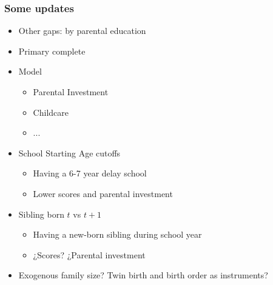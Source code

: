 \documentclass{beamer}
\begin{document}
\begin{frame}
    \label{update_scott}
    \frametitle{Some updates}
    \begin{itemize}
        \item Other gaps: by parental education
        \item Primary complete
        \item Model
            \begin{itemize}
            \item Parental Investment
            \item Childcare
            \item ...
            \end{itemize}
        \item School Starting Age cutoffs
            \begin{itemize}
                \item Having a 6-7 year delay school
                \item Lower scores and parental investment
            \end{itemize}
        \item Sibling born $t$ vs $t+1$
        \begin{itemize}
                \item Having a new-born sibling during school year 
                \item ¿Scores? ¿Parental investment
            \end{itemize}
        \item Exogenous family size? Twin birth and birth order as instruments?
            
    \end{itemize}
\end{frame}
\end{document}
